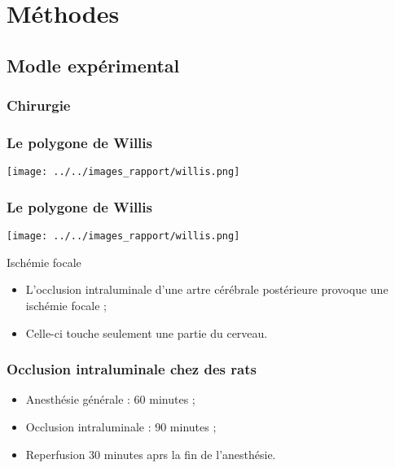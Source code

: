 \section{M\'ethodes}


\subsection{Modle exp\'erimental}


\subsubsection{Chirurgie}


\begin{frame}
\frametitle{Le polygone de Willis}
\texttt{[image: ../../images\_rapport/willis.png]}
\end{frame}


\begin{frame}
\frametitle{Le polygone de Willis}
\texttt{[image: ../../images\_rapport/willis.png]}

\begin{block}{Isch\'emie focale}%
\begin{itemize}
\item<+-> L'occlusion intraluminale d'une artre c\'er\'ebrale post\'erieure provoque une isch\'emie focale ;
\item<+-> Celle-ci touche seulement une partie du cerveau.
\end{itemize}
\end{block}
\end{frame}




\begin{frame}
\frametitle{Occlusion intraluminale chez des rats}
\begin{itemize}
\item<+-> Anesth\'esie g\'en\'erale : 60 minutes ;
\item<+-> Occlusion intraluminale : 90 minutes ;
\item<+-> Reperfusion 30 minutes aprs la fin de l'anesth\'esie.
\end{itemize}
\end{frame}


